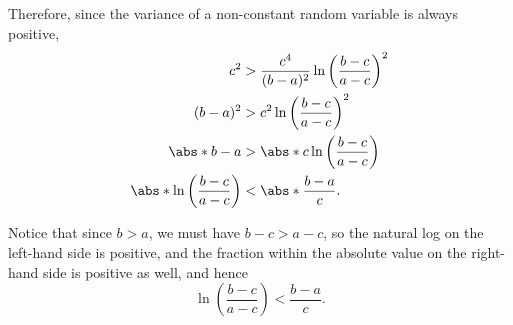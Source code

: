 \begin{enumerate}
          Therefore, since the variance of a non-constant random variable is always positive,
          \begin{align*}
              c^2                                         & > \frac{c^4}{(b - a)^2} \ln \left(\frac{b - c}{a - c}\right)^2 \\
              (b - a)^2                                   & > c^2 \ln \left(\frac{b - c}{a - c}\right)^2                   \\
              \abs*{b - a}                                & > \abs*{c \ln \left(\frac{b - c}{a - c}\right)}                \\
              \abs*{\ln \left(\frac{b - c}{a - c}\right)} & < \abs*{\frac{b - a}{c}}.
          \end{align*}

          Notice that since \(b > a\), we must have \(b - c > a - c\), so the natural log on the left-hand side is positive, and the fraction within the absolute value on the right-hand side is positive as well, and hence
          \[
              \ln \left(\frac{b - c}{a - c}\right) < \frac{b - a}{c}.
          \]
\end{enumerate}